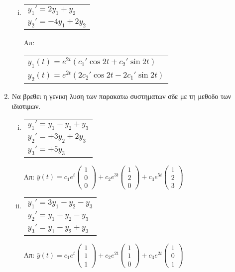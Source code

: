 \begin{enumerate}
\begin{enumerate}[i)]
\item \begin{tabular}{l} $y_1'=2y_1+y_2$ \\ $y_2'=-4y_1+2y_2$\end{tabular} \hfill Απ: \begin{tabular}{l}
$y_1(t)=e^{2t}(c_1'\cos 2t+c_2'\sin 2t)$ \\
$y_2(t)=e^{2t}(2c_2'\cos 2t-2c_1'\sin 2t)$
\end{tabular}

\end{enumerate}

\item Να βρεθει η γενικη λυση των παρακατω συστηματων σδε με τη μεθοδο των ιδιοτιμων.

\begin{enumerate}[i)]

\item \begin{tabular}{l} $y_1'=y_1+y_2+y_3$ \\ $y_2'=+3y_2+2y_3$ \\ $y_3'=+5y_3$\end{tabular}\hfill Απ: $\scriptstyle{\bar{y}(t)=c_1e^{t}\begin{pmatrix}
1\\0\\0
\end{pmatrix}+c_2e^{3t}\begin{pmatrix}
1\\2\\0
\end{pmatrix}+c_3e^{5t}\begin{pmatrix}
1\\2\\3
\end{pmatrix}}$

\item  \begin{tabular}{l} $y_1'=3y_1-y_2-y_3$ \\ $y_2'=y_1+y_2-y_3$ \\ $y_3'=y_1-y_2+y_3$\end{tabular}\hfill Απ: $\scriptstyle{\bar{y}(t)=c_1e^{t}\begin{pmatrix}
1\\1\\1
\end{pmatrix}+c_2e^{2t}\begin{pmatrix}
1\\1\\0
\end{pmatrix}+c_3e^{2t}\begin{pmatrix}
1\\0\\1
\end{pmatrix}}$



\end{enumerate}
\end{enumerate}
